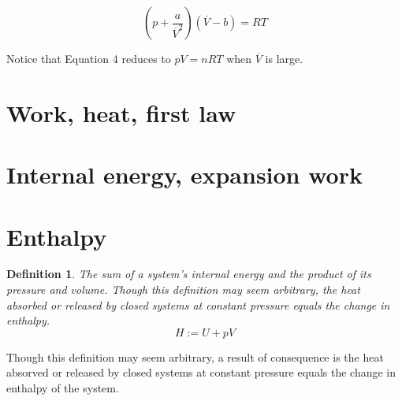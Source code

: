 \documentclass{article}
\numberwithin{theorem}{section}
\numberwithin{corollary}{section}
\numberwithin{postulate}{section}
\numberwithin{lemma}{section}
\newtheorem{definition}{Definition}
\numberwithin{definition}{section}
\begin{document}
\begin{equation}
  \left( p + \frac{a}{\overline{V}^2} \right) (\overline{V} - b) = RT 
\end{equation}

Notice that Equation 4 reduces to $pV = nRT$ when $\overline{V}$ is large.

\section{Work, heat, first law}

\section{Internal energy, expansion work}

\section{Enthalpy}

\begin{definition}
  The sum of a system's internal energy and the product of its pressure and
  volume. Though this definition may seem arbitrary, the heat absorbed or
  released by closed systems at constant pressure equals the change in enthalpy.
  \begin{equation}
   H := U + pV
  \end{equation}
\end{definition}


Though this definition may seem arbitrary, a result of consequence is the heat
absorved or released by closed systems at constant pressure equals the change in
enthalpy of the system.
\end{document}
